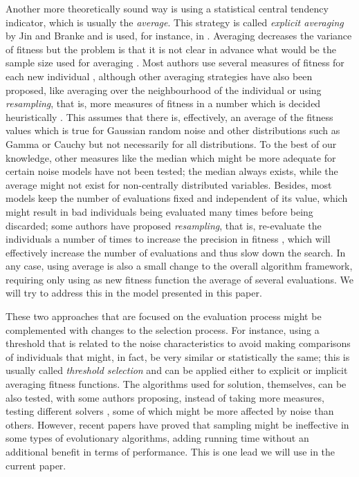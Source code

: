\documentclass{svmult}
\begin{document}
Another more theoretically sound way is using a statistical central tendency
indicator, which is usually the {\em average}. This strategy is called
{\em explicit averaging} by Jin and Branke and is used, for instance,
in 
\cite{Junhua20136780}. Averaging decreases the variance of fitness but
the problem is that it is not clear in advance what would be the
sample size used for averaging \cite{aizawa1994scheduling}. Most
authors use several measures of fitness for each new individual
\cite{costa2013using}, although other averaging strategies have also
been proposed, like averaging over the neighbourhood of the
individual or using {\em resampling}, that is, more measures of fitness in a
number which is decided heuristically
\cite{liu2014mathematically}. This assumes that there is, effectively,
an average of the 
fitness values which is true for Gaussian random noise and other
distributions such as Gamma or Cauchy but not
necessarily for all distributions. 
To the best of our knowledge, 
other measures like the median which might be more adequate for
certain noise models have not been tested; the median always exists,
while the average might not exist for non-centrally distributed
variables. Besides, most models keep the number of evaluations fixed 
and independent of its value, 
which might result in bad individuals
being evaluated many times before being discarded; some authors have
proposed {\em resampling}, that is, re-evaluate the individuals a number of times to increase the precision in fitness
\cite{RadaVilela2014,6900521}, 
which will effectively increase the number of
evaluations and thus slow down the search. In any case, using average is
also a small change to the overall algorithm framework, requiring only
using as new fitness function the average of several evaluations.
We will try to address this in the model presented in this
paper. 

These two approaches that are focused on the evaluation process might
be complemented with changes to the selection process. For instance,
using a threshold \cite{Rudolph2001318,6900521} that is related to the noise characteristics to
avoid making comparisons of individuals that might, in fact, be very
similar or statistically the same; this is usually called {\em
  threshold selection} and can be applied either to explicit or
implicit averaging fitness functions. The algorithms used for
solution, themselves, can be also tested, with some authors proposing, instead of taking more measures, 
testing different solvers \cite{cauwet2014algorithm}, some of which
might be more affected by noise than others. However, recent papers
have proved that sampling might be ineffective \cite{Qian:sampling} in
some types of evolutionary algorithms, adding running time without an
additional benefit in terms of performance. This is one lead we will
use in the current paper. 
\end{document}
